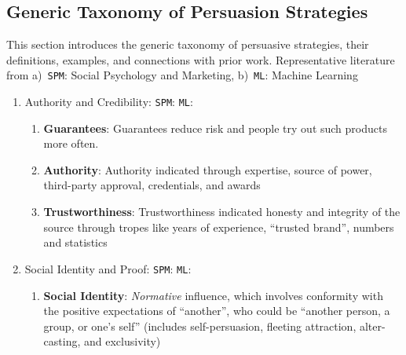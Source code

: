 \subsection{Generic Taxonomy of Persuasion Strategies}
\label{tab:persuasive-strategies-list}
This section introduces the generic taxonomy of persuasive strategies, their definitions, examples, and connections with prior work. Representative literature from a)~\texttt{SPM}: Social Psychology and Marketing, b)~\texttt{ML}: Machine Learning

\begin{enumerate}
    \item Authority and Credibility: \texttt{SPM}:\cite{aronson1963communicator,milgram1978obedience,cialdini2007influence,milgram1963behavioral,mcginnies1980better,giffin1967contribution,petty1986elaboration} \texttt{ML}:\cite{anand2011believe,iyer2019unsupervised,wachsmuth2017computational,ChenYang2021,durmus-cardie-2018-exploring}
    \begin{enumerate}
        \item \textbf{Guarantees}: Guarantees reduce risk and people try out such products more often. 

        \item \textbf{Authority}: Authority indicated through expertise, source of power, third-party approval, credentials, and awards
    
        \item \textbf{Trustworthiness}: Trustworthiness indicated honesty and integrity of the source through tropes like years of experience, ``trusted brand'', numbers and statistics
    \end{enumerate}

    \item Social Identity and Proof: \texttt{SPM}:\cite{deutsch1955study,petty1997attitudes,wood2000attitude,cialdini2004social,levesque2020human} \texttt{ML}: \cite{anand2011believe,iyer2019unsupervised,rosenthal2017detecting,yang2019let,zhang2016inferring,stab2017parsing,althoff2014ask,hidey2017analyzing,durmus-cardie-2018-exploring}

    \begin{enumerate}
        \item \textbf{Social Identity}: \textit{Normative} influence, which involves conformity with the positive expectations of ``another'', who could be ``another person, a group, or one's self'' (includes self-persuasion, fleeting attraction, alter-casting, and exclusivity)


\end{enumerate}
\end{enumerate}
